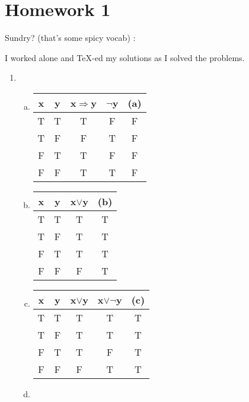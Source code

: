 \section{Homework 1}
 
Sundry? (that's some spicy vocab) :

I worked alone and TeX-ed my solutions as I solved the problems.

\begin{enumerate}
    \item\begin{enumerate}[(a)]
        \item {} \newline 
        \begin{tabular}{c|c|c|c|c}
            x & y & x$\Rightarrow$y & $\neg$y & (a) \\ \hline
            T & T & T & F & F \\ \hline
            T & F & F & T & F \\ \hline
            F & T & T & F & F \\ \hline
            F & F & T & T & F
        \end{tabular}
        \item {} \newline
        \begin{tabular}{c|c|c|c}
            x & y & x$\vee$y & (b) \\ \hline
            T & T & T & T \\ \hline
            T & F & T & T \\ \hline
            F & T & T & T \\ \hline
            F & F & F & T
        \end{tabular}
        \item {} \newline
        \begin{tabular}{c|c|c|c|c}
            x & y & x$\vee$y & x$\vee\neg$y & (c) \\ \hline
            T & T & T & T & T \\ \hline
            T & F & T & T & T \\ \hline
            F & T & T & F & T \\ \hline
            F & F & F & T & T
        \end{tabular}
        \item {} \newline

\end{enumerate}
\end{enumerate}
